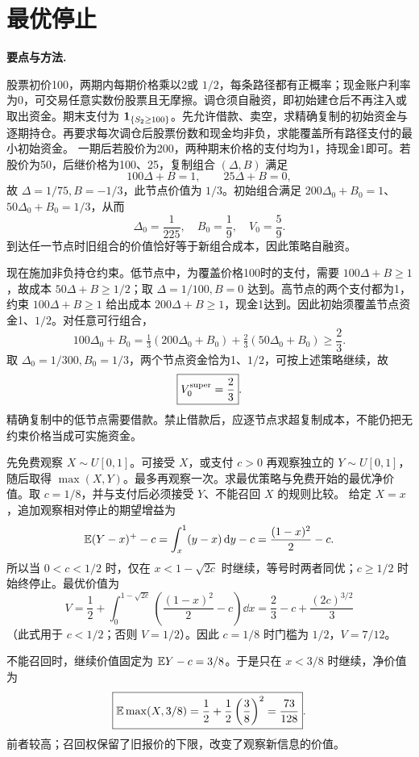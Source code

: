 \section{最优停止}
\noindent\textbf{要点与方法.}\enspace



股票初价100，两期内每期价格乘以2或 $1/2$，每条路径都有正概率；现金账户利率为0，可交易任意实数份股票且无摩擦。调仓须自融资，即初始建仓后不再注入或取出资金。期末支付为 $\mathbf{1}_{\{S_2\ge100\}}$。先允许借款、卖空，求精确复制的初始资金与逐期持仓。再要求每次调仓后股票份数和现金均非负，求能覆盖所有路径支付的最小初始资金。
\solution 一期后若股价为200，两种期末价格的支付均为1，持现金1即可。若股价为50，后继价格为100、25，复制组合 $(\Delta,B)$ 满足
\[
 100\Delta+B=1,\qquad25\Delta+B=0,
\]
故 $\Delta=1/75,B=-1/3$，此节点价值为 $1/3$。初始组合满足 $200\Delta_0+B_0=1$、$50\Delta_0+B_0=1/3$，从而
\[
 \boxed{\Delta_0=\frac1{225},\quad B_0=\frac19,\quad V_0=\frac59}.
\]
到达任一节点时旧组合的价值恰好等于新组合成本，因此策略自融资。

现在施加非负持仓约束。低节点中，为覆盖价格100时的支付，需要 $100\Delta+B\ge1$，故成本 $50\Delta+B\ge1/2$；取 $\Delta=1/100,B=0$ 达到。高节点的两个支付都为1，约束 $100\Delta+B\ge1$ 给出成本 $200\Delta+B\ge1$，现金1达到。因此初始须覆盖节点资金1、$1/2$。对任意可行组合，
\[
 100\Delta_0+B_0
 =\tfrac13(200\Delta_0+B_0)+\tfrac23(50\Delta_0+B_0)
 \ge\frac23.
\]
取 $\Delta_0=1/300,B_0=1/3$，两个节点资金恰为1、$1/2$，可按上述策略继续，故
\[
 \boxed{V_0^{\rm super}=\frac23}.
\]
\insight 精确复制中的低节点需要借款。禁止借款后，应逐节点求超复制成本，不能仍把无约束价格当成可实施资金。

先免费观察 $X\sim U[0,1]$。可接受 $X$，或支付 $c>0$ 再观察独立的 $Y\sim U[0,1]$，随后取得 $\max(X,Y)$。最多再观察一次。求最优策略与免费开始的最优净价值。取 $c=1/8$，并与支付后必须接受 $Y$、不能召回 $X$ 的规则比较。
\solution 给定 $X=x$，追加观察相对停止的期望增益为
\[
 \mathbb{E}(Y-x)^+-c=\int_x^1(y-x)\,\mathrm{d} y-c=\frac{(1-x)^2}{2}-c.
\]
所以当 $0<c<1/2$ 时，仅在 $x<1-\sqrt{2c}$ 时继续，等号时两者同优；$c\ge1/2$ 时始终停止。最优价值为
\[
 V=\frac12+\int_0^{1-\sqrt{2c}}
 \left(\frac{(1-x)^2}{2}-c\right)\dd x
 =\frac23-c+\frac{(2c)^{3/2}}3
\]
（此式用于 $c<1/2$；否则 $V=1/2$）。因此 $c=1/8$ 时门槛为 $1/2$，$\boxed{V=7/12}$。

不能召回时，继续价值固定为 $\mathbb{E} Y-c=3/8$。于是只在 $x<3/8$ 时继续，净价值为
\[
 \boxed{\mathbb{E}\max(X,3/8)=\frac12+\frac12\left(\frac38\right)^2
 =\frac{73}{128}}.
\]
前者较高；召回权保留了旧报价的下限，改变了观察新信息的价值。

